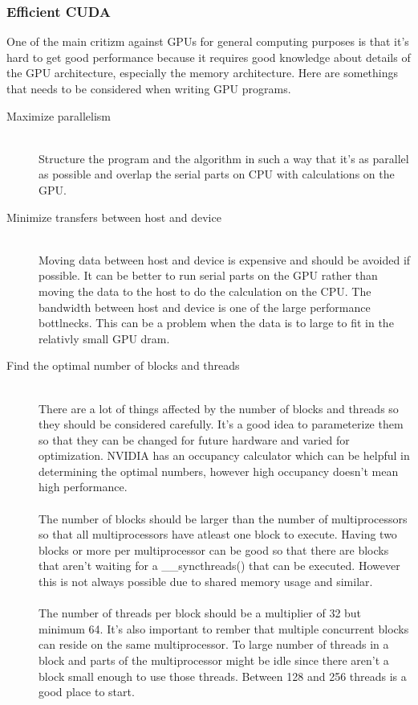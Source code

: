 \documentclass[10pt,a4paper]{article}
\begin{document}
\subsubsection{Efficient CUDA}
One of the main critizm against GPUs for general computing purposes is that it's hard to get good performance because it requires good knowledge about details of the GPU architecture, especially the memory architecture. Here are somethings that needs to be considered when writing GPU programs.\cite{plink_gpu, cuda, cuda_best_practice}
\\
\begin{description}
  \item[Maximize parallelism] \hfill \\
  Structure the program and the algorithm in such a way that it's as parallel as possible and overlap the serial parts on CPU with calculations on the GPU.\cite{plink_gpu, cuda}
  \item[Minimize transfers between host and device] \hfill \\
  Moving data between host and device is expensive and should be avoided if possible. It can be better to run serial parts on the GPU rather than moving the data to the host to do the calculation on the CPU. The bandwidth between host and device is one of the large performance bottlnecks. This can be a problem when the data is to large to fit in the relativly small GPU dram.\cite{cuda, cuda_best_practice}
  \item[Find the optimal number of blocks and threads] \hfill \\
  There are a lot of things affected by the number of blocks and threads so they should be considered carefully. It's a good idea to parameterize them so that they can be changed for future hardware and varied for optimization. NVIDIA has an occupancy calculator which can be helpful in determining the optimal numbers, however high occupancy doesn't mean high performance.\cite{cuda, cuda_best_practice}\\
  \\
  The number of blocks should be larger than the number of multiprocessors so that all multiprocessors have atleast one block to execute. Having two blocks or more per multiprocessor can be good so that there are blocks that aren't waiting for a \_\_syncthreads() that can be executed. However this is not always possible due to shared memory usage and similar.\cite{cuda_best_practice}\\
  \\  
  The number of threads per block should be a multiplier of 32 but minimum 64. It's also important to rember that multiple concurrent blocks can reside on the same multiprocessor. To large number of threads in a block and parts of the multiprocessor might be idle since there aren't a block small enough to use those threads. Between 128 and 256 threads is a good place to start.\cite{cuda_best_practice}

\end{description}
\end{document}
